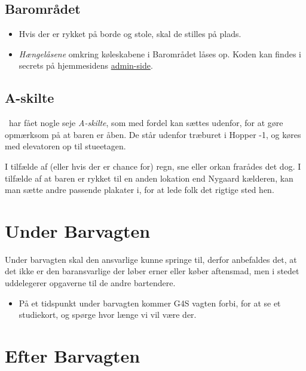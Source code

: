 \subsection{Barområdet}
\label{sec:pre:baromradet}

\begin{itemize}
    \item Hvis der er rykket på borde og stole, skal de stilles på plads.
    \item \textit{Hængelåsene} omkring køleskabene i Barområdet låses op. 
    Koden kan findes i secrets på hjemmesidens \href{https://fredagscafeen.dk/admin/admin/secrets/}{admin-side}.
\end{itemize}

\subsection{A-skilte}
\label{sec:pre:a-skilte}
\fredagscafeen\ har fået nogle seje \textit{A-skilte}, 
som med fordel kan sættes udenfor, 
for at gøre opmærksom på at baren er åben.
De står udenfor træburet i Hopper -1, og 
køres med elevatoren op til stueetagen.

I tilfælde af (eller hvis der er chance for) regn, sne eller orkan
frarådes det dog.
I tilfælde af at baren er rykket til en anden lokation end Nygaard kælderen, 
kan man sætte andre passende plakater i, for at lede folk det rigtige sted hen.

\section{Under Barvagten}
\label{sec:intra-barvagten}
Under barvagten skal den ansvarlige kunne springe til, 
derfor anbefaldes det, at det ikke er den baransvarlige 
der løber erner eller køber aftensmad, men i stedet uddelegerer
opgaverne til de andre bartendere.
\begin{itemize}
    \item På et tidspunkt under barvagten kommer G4S vagten forbi, 
    for at se et studiekort, og spørge hvor længe vi vil være der.
\end{itemize}

\section{Efter Barvagten}
\label{sec:post-barvagten}


